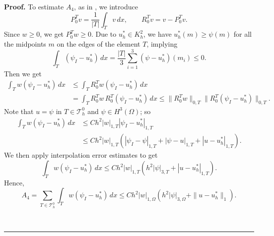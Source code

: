 \documentclass[12pt]{article}
\newenvironment{proof}[1][Proof]{\textbf{#1.} }
{\ \rule{0.75em}{0.75em}\smallskip}
\begin{document}
\begin{proof}
To estimate $A_4$, as in \cite{wang02}, we introduce
\[P^T_0 v = \frac{1}{|T|}\int_T v\,dx,\quad\quad  R^T_0 v = v - P^T_0 v.\]
Since $w\geq 0$, we get $P^T_0 w \geq 0$. Due to $u_h^*\in K_{h}^2$, we have
$u_h^*(m)\geq \psi(m)$ for all the midpoints $m$ on the edges of the element
$T$, implying
\[ \int_T (\psi_I - u_h^*)\,dx=\frac{|T|}{3}\sum_{i=1}^3 (\psi - u_h^*)(m_i)\leq 0. \]
Then we get
\begin{align*}
\int_T w(\psi_I - u_h^*)\,dx & \leq \int_T R^T_0 w(\psi_I - u_h^*)\,dx\\
&=\int_T R^T_0 w \, R^T_0(\psi_I - u_h^*)\,dx \leq \|R^T_0
w\|_{0,T}\|R^T_0(\psi_I - u_h^*)\|_{0,T}.
\end{align*}
Note that $u=\psi$ in $T \in \mathcal{T}_h^0$ and $\psi\in H^3(\Omega)$; so
\begin{align*}
\int_T w(\psi_I - u_h^*)\,dx &\leq C h^2 |w|_{1,T}|\psi_I-u_h^*|_{1,T}\\
&\leq C h^2 |w|_{1,T}(|\psi_I-\psi|_{1,T}+|\psi-u|_{1,T}+|u- u_h^*|_{1,T}).
\end{align*}
We then apply interpolation error estimates to get
\begin{equation}
\int_T w(\psi_I - u_h^*)\,dx 
\leq C h^2 |w|_{1,T}(h^2|\psi|_{3,T}+|u-u_h^*|_{1,T}).
\label{3.8a}
\end{equation}
Hence,
\begin{equation}\label{err3qua}
A_4 = \sum_{T\in \mathcal{T}_h^0}\int_T w(\psi_I-u_h^*)\, dx 
\leq C h^2 |w|_{1,\Omega}(h^2|\psi|_{3,\Omega}+\|u-u_h^*\|_1).
\end{equation}


\end{proof}
\end{document}

